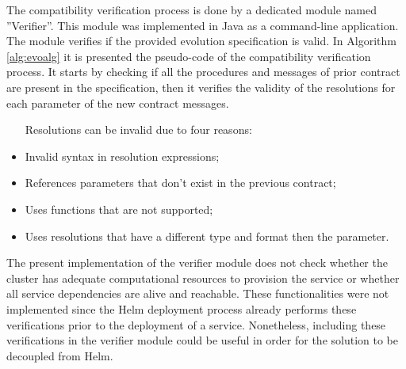 The compatibility verification process is done by a dedicated module named ''Verifier''.
This module was implemented in Java as a command-line application.
The module verifies if the provided evolution specification is valid.
In Algorithm \ref{alg:evoalg} it is presented the pseudo-code of the compatibility verification process.
It starts by checking if all the procedures and messages of prior contract are present in the specification,
then it verifies the validity of the resolutions for each parameter of the new contract messages.
\begin{itemize}
    \setlength\itemsep{0em}
    \item [Resolutions can be invalid due to four reasons:]
    \item Invalid syntax in resolution expressions;
    \item References parameters that don't exist in the previous contract;
    \item Uses functions that are not supported;
    \item Uses resolutions that have a different type and format then the parameter.
\end{itemize}

The present implementation of the verifier module does not check whether the cluster has adequate computational resources to provision the service or whether all service dependencies are alive and reachable.
These functionalities were not implemented since the Helm deployment process already performs these verifications prior to the deployment of a service.
Nonetheless, including these verifications in the verifier module could be useful in order for the solution to be decoupled from Helm.


